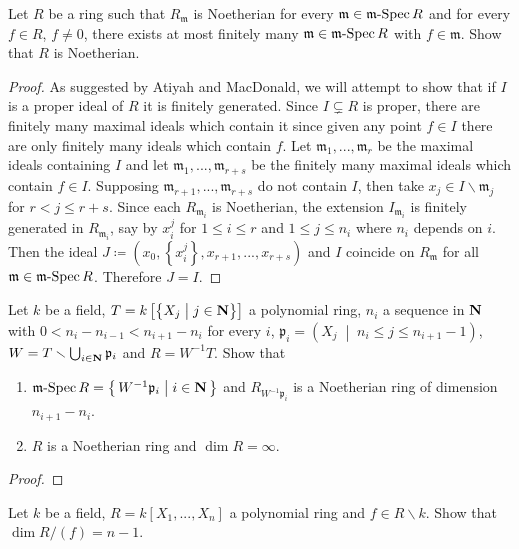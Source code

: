 \begin{problem}
Let $R$ be a ring such that $R_{\mathfrak{m}}$ is Noetherian for
every $\mathfrak{m}\in\operatorname{\mathfrak{m}-Spec} R$ and for every $f\in R$, $f\neq
0$, there exists at most finitely many $\mathfrak{m}\in\operatorname{\mathfrak{m}-Spec} R$
with $f\in\mathfrak{m}$. Show that $R$ is Noetherian.
\end{problem}
\begin{proof}
As suggested by Atiyah and MacDonald, we will attempt to show that if
$I$ is a proper ideal of $R$ it is finitely generated. Since $I\subsetneq
R$ is proper, there are finitely many maximal ideals which contain it since
given any point $f\in I$ there are only finitely many ideals which
contain $f$. Let $\mathfrak{m}_1,...,\mathfrak{m}_r$ be the maximal
ideals containing $I$ and let $\mathfrak{m}_1,...,\mathfrak{m}_{r+s}$ be
the finitely many maximal ideals which contain $f\in I$. Supposing
$\mathfrak{m}_{r+1},...,\mathfrak{m}_{r+s}$ do not contain $I$, then take
$x_j\in I\smallsetminus\mathfrak{m}_j$ for $r<j\leq r+s$. Since each
$R_{\mathfrak{m}_i}$ is Noetherian, the extension $I_{\mathfrak{m}_i}$ is
finitely generated in $R_{\mathfrak{m}_i}$, say by $x_i^j$ for $1\leq i\leq
r$ and $1\leq j\leq n_i$ where $n_i$ depends on $i$. Then the ideal
$J\coloneqq (x_0,\left\{x_i^j\right\},x_{r+1},...,x_{r+s})$ and $I$
coincide on $R_{\mathfrak{m}}$ for all $\mathfrak{m}\in\operatorname{\mathfrak{m}-Spec} R$. Therefore
$J=I$.
\end{proof}
\newpage
\begin{problem}
Let $k$ be a field, $T=k\left[\bigl\{X_j\;\middle|\;j\in\mathbf{N}\bigr\}\right]$ a
polynomial ring, $n_i$ a sequence in $\mathbf{N}$ with
$0<n_i-n_{i-1}<n_{i+1}-n_i$ for every $i$,
$\mathfrak{p}_i=\left(X_j\;\middle|\;n_i\leq j\leq
  n_{i+1}-1\right)$,
$W=T\smallsetminus\bigcup_{i\in\mathbf{N}}\mathfrak{p}_i$ and
$R=W^{-1}T$. Show that
\begin{enumerate}[label=(\alph*)]
\item $\operatorname{\mathfrak{m}-Spec}
  R=\left\{\,W^{-1}\mathfrak{p}_i\;\middle|\;i\in\mathbf{N}\,\right\}$
  and $R_{W^{-1}\mathfrak{p}_i}$ is a Noetherian ring of
  dimension $n_{i+1}-n_i$.
\item $R$ is a Noetherian ring and $\dim R=\infty$.
\end{enumerate}
\end{problem}
\begin{proof}
\end{proof}
\newpage
\begin{problem}
Let $k$ be a field, $R=k[X_1,...,X_n]$ a polynomial ring and
$f\in R\smallsetminus k$. Show that $\dim R/(f)=n-1$.
\end{problem}
